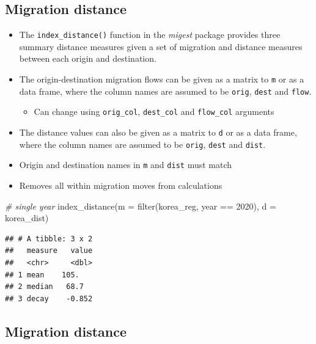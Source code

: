 \documentclass[
]{book}
\newenvironment{Shaded}{\begin{snugshade}}{\end{snugshade}}
\newcommand{\AttributeTok}[1]{\textcolor[rgb]{0.77,0.63,0.00}{#1}}
\newcommand{\CommentTok}[1]{\textcolor[rgb]{0.56,0.35,0.01}{\textit{#1}}}
\newcommand{\DecValTok}[1]{\textcolor[rgb]{0.00,0.00,0.81}{#1}}
\newcommand{\FunctionTok}[1]{\textcolor[rgb]{0.00,0.00,0.00}{#1}}
\newcommand{\NormalTok}[1]{#1}
\newcommand{\SpecialCharTok}[1]{\textcolor[rgb]{0.00,0.00,0.00}{#1}}
\providecommand{\tightlist}{%
  \setlength{\itemsep}{0pt}\setlength{\parskip}{0pt}}
\begin{document}
\hypertarget{migration-distance-2}{%
\subsection{Migration distance}\label{migration-distance-2}}

\begin{itemize}
\tightlist
\item
  The \texttt{index\_distance()} function in the \emph{migest} package provides three summary distance measures given a set of migration and distance measures between each origin and destination.
\item
  The origin-destination migration flows can be given as a matrix to \texttt{m} or as a data frame, where the column names are assumed to be \texttt{orig}, \texttt{dest} and \texttt{flow}.

  \begin{itemize}
  \tightlist
  \item
    Can change using \texttt{orig\_col}, \texttt{dest\_col} and \texttt{flow\_col} arguments
  \end{itemize}
\item
  The distance values can also be given as a matrix to \texttt{d} or as a data frame, where the column names are assumed to be \texttt{orig}, \texttt{dest} and \texttt{dist}.
\item
  Origin and destination names in \texttt{m} and \texttt{dist} must match
\item
  Removes all within migration moves from calculations
\end{itemize}

\begin{Shaded}
\begin{Highlighting}[]
\CommentTok{\# single year}
\FunctionTok{index\_distance}\NormalTok{(}\AttributeTok{m =} \FunctionTok{filter}\NormalTok{(korea\_reg, year }\SpecialCharTok{==} \DecValTok{2020}\NormalTok{),}
               \AttributeTok{d =}\NormalTok{ korea\_dist)}
\end{Highlighting}
\end{Shaded}

\begin{verbatim}
## # A tibble: 3 x 2
##   measure   value
##   <chr>     <dbl>
## 1 mean    105.   
## 2 median   68.7  
## 3 decay    -0.852
\end{verbatim}

\hypertarget{migration-distance-3}{%
\subsection{Migration distance}\label{migration-distance-3}}
\end{document}
